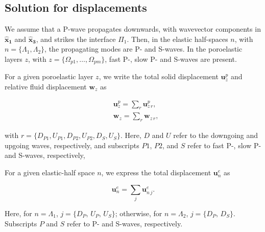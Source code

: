 \documentclass[draft]{agujournal2019}
\begin{document}
\subsection{Solution for displacements}
We assume that a P-wave propagates downwards, with wavevector components in $\bm{\hat x_1}$ and  $\bm{\hat x_3}$, and strikes the interface $\Pi_1$.  Then, in the elastic half-spaces $n$, with $n =\{\Lambda_1,\Lambda_2\}$, the propagating modes  are P- and S-waves. In the poroelastic layers $z$, with $z=\{\Omega_{p1},\dots,\Omega_{pm}\}$, fast P-, slow P- and S-waves are present.

For a given poroelastic layer $z$, we write the total solid displacement $\bm{u}_z^p$  and relative fluid displacement $\bm{w}_z$ as
\begin{linenomath*}
\begin{equation}\label{Eq.a7}
\begin{split}
& \bm{u}_z^{p} =  \sum_r \bm{u}_{z\,r}^p, \\
& \bm{w}_z =  \sum_r \bm{w}_{z\,r},
\end{split}
\end{equation}
\end{linenomath*}
with $r=\{D_{P1},U_{P1},D_{P2},U_{P2},D_{S},U_{S}\}$. Here, $D$ and $U$ refer to the downgoing and upgoing waves, respectively, and subscripts $P1$, $P2$, and $S$ refer to fast P-, slow P- and S-waves, respectively,

For a given elastic-half space $n$,  we express the total displacement $\bm{u}_n^e$ as
\begin{linenomath*}
\begin{equation}\label{Eq.a8}
\bm{u}_n^{e} =  \sum_j \bm{u}_{n\,j}^e.
\end{equation}
\end{linenomath*}
Here, for $n =\Lambda_1 $,  $j=\{D_P,\,U_P,\,U_S\}$; otherwise, for $n =\Lambda_2 $, $j=\{D_P,\,D_S\}$. Subscripts $P$  and $S$ refer to P- and S-waves, respectively. 
\end{document}
